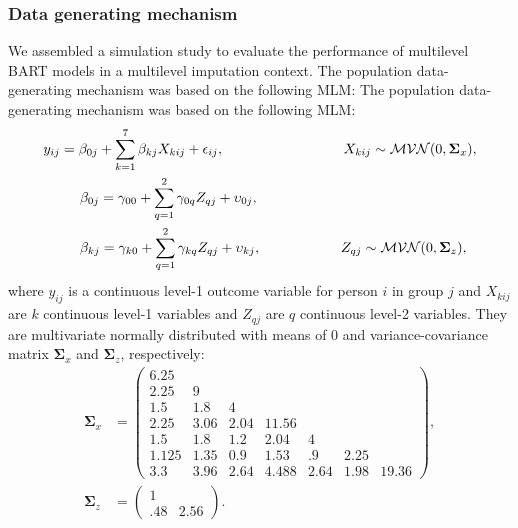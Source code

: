 \documentclass[10pt, a4paper, titlepage]{article}
\begin{document}
\subsubsection{Data generating mechanism}
We assembled a simulation study to evaluate the performance of multilevel BART models in a multilevel imputation context. The population data-generating mechanism was based on the following MLM:
The population data-generating mechanism was based on the following MLM:
\begin{subequations}
\label{eq:population}
\begin{align}
        y_{ij} &= \beta_{0j} + \sum_{k=1}^{7}\beta_{kj}X_{kij} + \epsilon_{ij}, \hspace{3cm} X_{kij} \sim \mathcal{MVN}(0, \boldsymbol{\Sigma}_{x}), \label{eq:population1} \\
        &\hspace{.5cm}\beta_{0j} = \gamma_{00} + \sum_{q=1}^{2}\gamma_{0q}Z_{qj} + \upsilon_{0j}, \label{eq:beta0}\\
        &\hspace{.5cm}\beta_{kj} = \gamma_{k0} + \sum_{q=1}^{2}\gamma_{kq}Z_{qj} + \upsilon_{kj}, \hspace{2cm} Z_{qj} \sim \mathcal{MVN}(0, \boldsymbol{\Sigma}_{z}), \label{eq:betak}
\end{align}
\end{subequations} where $y_{ij}$ is a continuous level-1 outcome variable for person $i$ in group $j$ and $X_{kij}$ are $k$ continuous level-1 variables and $Z_{qj}$ are $q$ continuous level-2 variables. They are multivariate normally distributed with means of 0 and variance-covariance matrix $\boldsymbol{\Sigma}_{x}$ and $\boldsymbol{\Sigma}_{z}$, respectively:
\begin{subequations}
\begin{align}
    \boldsymbol{\Sigma}_{x} &= \begin{pmatrix}
        6.25& & & & & & \\
        2.25& 9& & & & & \\
        1.5& 1.8& 4& & & & \\
        2.25& 3.06& 2.04& 11.56& & & \\
        1.5& 1.8& 1.2& 2.04& 4& & \\
        1.125& 1.35& 0.9& 1.53& .9& 2.25& \\
        3.3& 3.96& 2.64& 4.488& 2.64& 1.98& 19.36
    \end{pmatrix}, \label{eq:sigma.x} \\
    \boldsymbol{\Sigma}_{z} &= \begin{pmatrix}
        1& \\
        .48& 2.56
    \end{pmatrix}. \label{eq:sigma.z}
\end{align}
\end{subequations}
\end{document}
